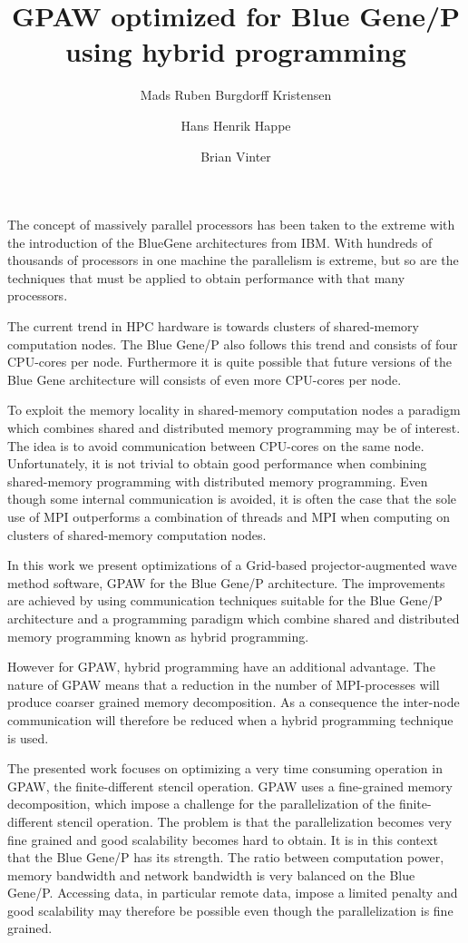 \documentclass[a4paper,10pt]{article}
\title{GPAW optimized for Blue Gene/P \\ using hybrid programming}
\author{Mads Ruben Burgdorff Kristensen \and Hans Henrik Happe \and Brian Vinter}
\begin{document}
\maketitle
The concept of massively parallel processors has been taken to the extreme with the introduction of the BlueGene architectures from IBM. With hundreds of thousands of processors in one machine the parallelism is extreme, but so are the techniques that must be applied to obtain performance with that many processors.

The current trend in HPC hardware is towards clusters of shared-memory computation nodes. The Blue Gene/P also follows this trend and consists of four CPU-cores per node. Furthermore it is quite possible that future versions of the Blue Gene architecture will consists of even more CPU-cores per node.

To exploit the memory locality in shared-memory computation nodes a paradigm which combines shared and distributed memory programming may be of interest. The idea is to avoid communication between CPU-cores on the same node. Unfortunately, it is not trivial to obtain good performance when combining shared-memory programming with distributed memory programming. Even though some internal communication is avoided, it is often the case that the sole use of MPI\cite{mpi} outperforms a combination of threads and MPI when computing on clusters of shared-memory computation nodes\cite{henty2000, hipp04Hybrid, VinterB}.

In this work we present optimizations of a Grid-based projector-augmented wave method software, GPAW \cite{Mortensen05} for the Blue Gene/P architecture. The improvements are achieved by using communication techniques suitable for the Blue Gene/P architecture and a programming paradigm which combine shared and distributed memory programming known as hybrid programming.

However for GPAW, hybrid programming have an additional advantage. The nature of GPAW means that a reduction in the number of MPI-processes will produce coarser grained memory decomposition. As a consequence the inter-node communication will therefore be reduced when a hybrid programming technique is used.

The presented work focuses on optimizing a very time consuming operation in GPAW, the finite-different stencil operation. GPAW uses a fine-grained memory decomposition, which impose a challenge for the parallelization of the finite-different stencil operation. The problem is that the parallelization becomes very fine grained and good scalability becomes hard to obtain. It is in this context that the Blue Gene/P has its strength. The ratio between computation power, memory bandwidth and network bandwidth is very balanced on the Blue Gene/P. Accessing data, in particular remote data, impose a limited penalty and good scalability may therefore be possible even though the parallelization is fine grained.
\end{document}
